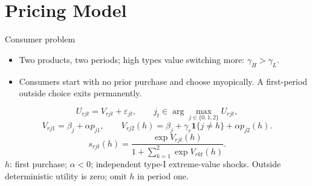 \documentclass[aspectratio=169,11pt]{beamer}
\begin{document}
\section{Pricing Model}
\begin{frame}[label=pricing-setup]{Consumer problem}
\begin{itemize}
\item Two products, two periods; high types value switching more: $\gamma_H>\gamma_L$.
\item Consumers start with no prior purchase and choose myopically. A first-period outside choice exits permanently.
\end{itemize}
\[
U_{rjt}=V_{rjt}+\varepsilon_{jt},\qquad
j_t\in\arg\max_{j\in\{0,1,2\}}U_{rjt},
\]
\[
V_{rj1}=\beta_j+\alpha p_{j1},\qquad
V_{rj2}(h)=\beta_j+\gamma_r\mathbf1\{j\ne h\}+\alpha p_{j2}(h).
\]
\[
s_{rjt}(h)=\frac{\exp V_{rjt}(h)}{1+\sum_{k=1}^2\exp V_{rkt}(h)}.
\]
\small $h$: first purchase; $\alpha<0$; independent type-I extreme-value shocks. Outside deterministic utility is zero; omit $h$ in period one.
\end{frame}
\end{document}
